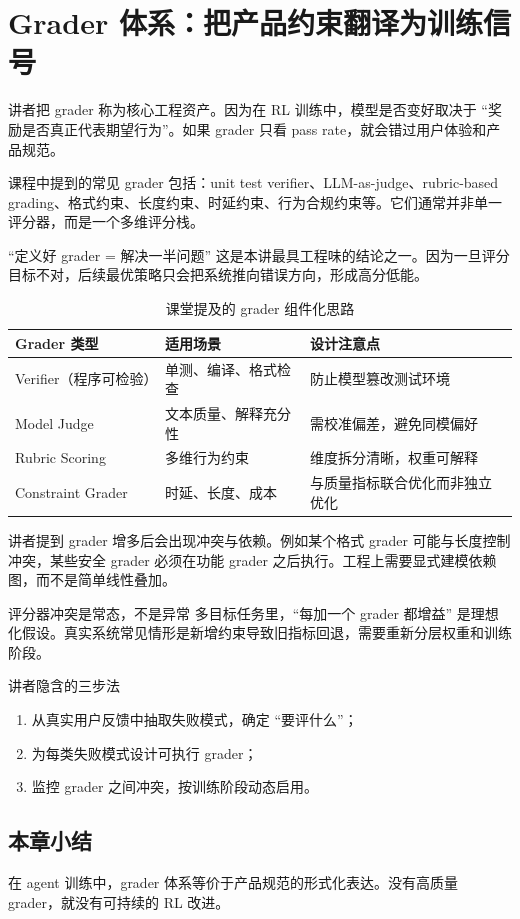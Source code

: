 \section{Grader 体系：把产品约束翻译为训练信号}

讲者把 grader 称为核心工程资产。因为在 RL 训练中，模型是否变好取决于 ``奖励是否真正代表期望行为''。如果 grader 只看 pass rate，就会错过用户体验和产品规范。

课程中提到的常见 grader 包括：unit test verifier、LLM-as-judge、rubric-based grading、格式约束、长度约束、时延约束、行为合规约束等。它们通常并非单一评分器，而是一个多维评分栈。

\begin{importantbox}{``定义好 grader = 解决一半问题''}
这是本讲最具工程味的结论之一。因为一旦评分目标不对，后续最优策略只会把系统推向错误方向，形成高分低能。
\end{importantbox}

\begin{table}[H]
\centering
\begin{tabular}{p{2.5cm}p{3.2cm}p{4.8cm}}
\toprule
\textbf{Grader 类型} & \textbf{适用场景} & \textbf{设计注意点} \\
\midrule
Verifier（程序可检验） & 单测、编译、格式检查 & 防止模型篡改测试环境 \\
Model Judge & 文本质量、解释充分性 & 需校准偏差，避免同模偏好 \\
Rubric Scoring & 多维行为约束 & 维度拆分清晰，权重可解释 \\
Constraint Grader & 时延、长度、成本 & 与质量指标联合优化而非独立优化 \\
\bottomrule
\end{tabular}
\caption{课堂提及的 grader 组件化思路}
\end{table}

讲者提到 grader 增多后会出现冲突与依赖。例如某个格式 grader 可能与长度控制冲突，某些安全 grader 必须在功能 grader 之后执行。工程上需要显式建模依赖图，而不是简单线性叠加。

\begin{warningbox}{评分器冲突是常态，不是异常}
多目标任务里，``每加一个 grader 都增益'' 是理想化假设。真实系统常见情形是新增约束导致旧指标回退，需要重新分层权重和训练阶段。
\end{warningbox}

\begin{knowledgebox}{讲者隐含的三步法}
\begin{enumerate}
    \item 从真实用户反馈中抽取失败模式，确定 ``要评什么''；
    \item 为每类失败模式设计可执行 grader；
    \item 监控 grader 之间冲突，按训练阶段动态启用。
\end{enumerate}
\end{knowledgebox}

\subsection{本章小结}
在 agent 训练中，grader 体系等价于产品规范的形式化表达。没有高质量 grader，就没有可持续的 RL 改进。

